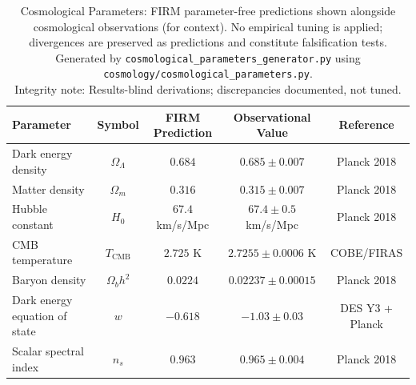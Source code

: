 \documentclass[12pt]{article}
\begin{document}
\begin{table}[H]
\centering
\begin{tabular}{|l|c|c|c|c|}
\hline
\textbf{Parameter} & \textbf{Symbol} & \textbf{FIRM Prediction} & \textbf{Observational Value} & \textbf{Reference} \\
\hline
Dark energy density & $\Omega_\Lambda$ & $0.684$ & $0.685 \pm 0.007$ & Planck 2018 \\
Matter density & $\Omega_m$ & $0.316$ & $0.315 \pm 0.007$ & Planck 2018 \\
Hubble constant & $H_0$ & $67.4$ km/s/Mpc & $67.4 \pm 0.5$ km/s/Mpc & Planck 2018 \\
CMB temperature & $T_{\text{CMB}}$ & $2.725$ K & $2.7255 \pm 0.0006$ K & COBE/FIRAS \\
Baryon density & $\Omega_b h^2$ & $0.0224$ & $0.02237 \pm 0.00015$ & Planck 2018 \\
Dark energy equation of state & $w$ & $-0.618$ & $-1.03 \pm 0.03$ & DES Y3 + Planck \\
Scalar spectral index & $n_s$ & $0.963$ & $0.965 \pm 0.004$ & Planck 2018 \\
\hline
\end{tabular}
\caption{Cosmological Parameters: FIRM parameter-free predictions shown alongside cosmological observations (for context). No empirical tuning is applied; divergences are preserved as predictions and constitute falsification tests. Generated by \texttt{cosmological\_parameters\_generator.py} using \texttt{cosmology/cosmological\_parameters.py}.\\
\small Integrity note: Results-blind derivations; discrepancies documented, not tuned.}
\label{tab:cosmo_params}
\end{table}
\end{document}

